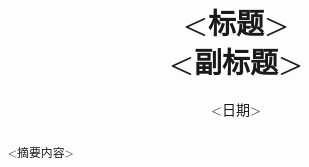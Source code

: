 \documentclass[12pt,a4paper]{ctexart}
\title{\textbf{<标题>\\[4pt]
\large <副标题>}}
\author{}
\date{<日期>}
\begin{document}
\maketitle

\begin{abstract}
\noindent <摘要内容>
\end{abstract}

\newpage

\tableofcontents

\newpage

\end{document}

